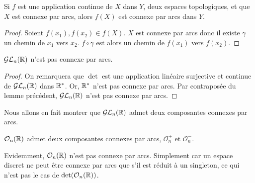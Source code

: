 \documentclass[../main.tex]{subfiles}
\begin{document}
\begin{lemma} Si \(f\) est une application continue de \(X\) dans \(Y\), deux espaces topologiques, et que
    \(X\) est connexe par arcs, alors \(f(X)\) est connexe par arcs dans \(Y\).
\end{lemma}
\begin{proof}
    Soient \(f(x_1),f(x_2)\in f(X)\). \(X\) est connexe par arcs donc il existe \(\gamma\) un chemin de \(x_1\) vers \(x_2\).
    \(f\circ\gamma\) est alors un chemin de \(f(x_1)\) vers \(f(x_2)\).
\end{proof}
\begin{proposition} \(\mathcal{GL}_n(\mathbb{R})\) n'est pas connexe par arcs.
\end{proposition}
\begin{proof} On remarquera que \(\det\) est une application linéaire surjective et continue de \(\mathcal{GL}_n(\mathbb{R})\) dans \(\mathbb{R}^*\).
    Or, \(\mathbb{R}^*\) n'est pas connexe par arcs. Par contraposée du lemme précédent, \(\mathcal{GL}_n(\mathbb{R})\) n'est pas connexe par arcs.
\end{proof}
Nous allons en fait montrer que \(\mathcal{GL}_n(\mathbb{R})\) admet deux composantes connexes par arcs.
\begin{lemma} \(\mathcal{O}_n(\mathbb{R})\) admet deux composantes connexes par arcs, \(\mathcal{O}_n^+\) et \(\mathcal{O}_n^-\).
\end{lemma}
Evidemment, \(\mathcal{O}_n(\mathbb{R})\)  n'est pas connexe par arcs. Simplement car un espace discret ne peut être connexe par arcs que s'il est réduit à un singleton, ce qui n'est pas le cas de \(\det(\mathcal{O}_n(\mathbb{R}))\).
\end{document}
